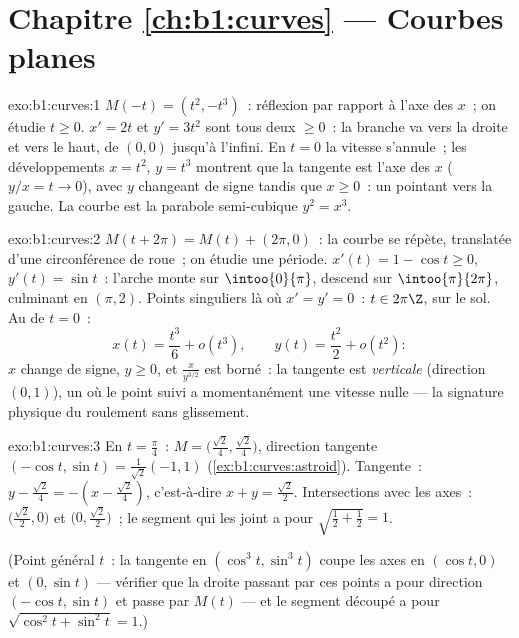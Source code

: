 \section*{Chapitre \ref{ch:b1:curves} --- Courbes planes}

\begin{solution}{exo:b1:curves:1}
$M(-t) = (t^2, -t^3)$~: réflexion par rapport à l'axe des $x$~; on étudie $t \geq 0$.
$x' = 2t$ et $y' = 3t^2$ sont tous deux $\geq 0$~: la branche va vers
la droite et vers le haut, de $(0,0)$ jusqu'à l'infini. En $t = 0$ la vitesse
s'annule~; les développements $x = t^2$, $y = t^3$ montrent que la tangente est
l'axe des $x$ ($y/x = t \to 0$), avec $y$ changeant de signe tandis que $x \geq 0$~:
un \emph{} pointant vers la gauche. La courbe est la parabole
semi-cubique $y^2 = x^3$.
\end{solution}

\begin{solution}{exo:b1:curves:2}
$M(t + 2\pi) = M(t) + (2\pi, 0)$~: la courbe se répète, translatée d'une
circonférence de roue~; on étudie une période. $x'(t) = 1 - \cos t \geq
0$, $y'(t) = \sin t$~: l'arche monte sur $\intoo{0}{\pi}$, descend sur
$\intoo{\pi}{2\pi}$, culminant en $(\pi, 2)$. Points singuliers
là où $x' = y' = 0$~: $t \in 2\pi\Z$, sur le sol. Au  de $t = 0$~:
\[
x(t) = \frac{t^3}{6} + o(t^3),
\qquad
y(t) = \frac{t^2}{2} + o(t^2):
\]
$x$ change de signe, $y \geq 0$, et $\frac{x}{y^{3/2}}$ est borné~: la
tangente est \emph{verticale} (direction $(0,1)$), un  où le
point suivi a momentanément une vitesse nulle --- la signature physique
du roulement sans glissement.
\end{solution}

\begin{solution}{exo:b1:curves:3}
En $t = \frac\pi4$~: $M = \bigl(\frac{\sqrt2}{4},
\frac{\sqrt2}{4}\bigr)$, direction tangente $(-\cos t, \sin t) =
\frac{1}{\sqrt2}(-1, 1)$ (\cref{ex:b1:curves:astroid}). Tangente~:
$y - \frac{\sqrt2}{4} = -(x - \frac{\sqrt2}{4})$, c'est-à-dire $x +
y = \frac{\sqrt2}{2}$. Intersections avec les axes~: $\bigl(\frac{\sqrt2}{2},
0\bigr)$ et $\bigl(0, \frac{\sqrt2}{2}\bigr)$~; le segment qui les joint
a pour  $\sqrt{\frac12 + \frac12} = 1$.

(Point général $t$~: la tangente en $(\cos^3 t, \sin^3 t)$ coupe les
axes en $(\cos t, 0)$ et $(0, \sin t)$ --- vérifier que la droite
passant par ces points a pour direction $(-\cos t, \sin t)$ et passe
par $M(t)$ --- et le segment découpé a pour  $\sqrt{\cos^2 t +
\sin^2 t} = 1$.)
\end{solution}

